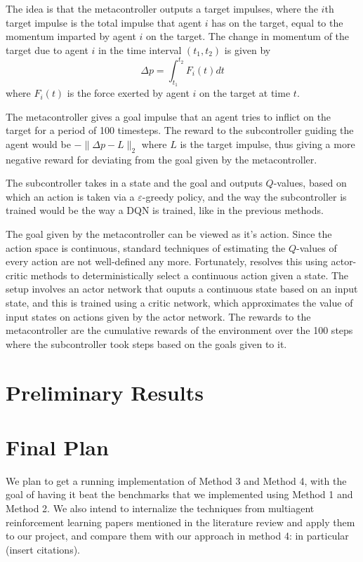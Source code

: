 \documentclass{article}
\begin{document}
The idea is that the metacontroller outputs a target
impulses, where the $i$th target impulse is the total impulse
that agent $i$ has on the target, equal to the momentum
imparted by agent $i$ on the target. The change in momentum of the target due to
agent $i$ in the time interval $(t_1,t_2)$ is given by
\[
\Delta p = \int_{t_1}^{t_2} F_i(t)dt
\]
where $F_i(t)$ is the force exerted by agent $i$ on the target at time $t$.

The metacontroller gives a goal impulse that an agent tries to inflict on the target
for a period of 100 timesteps.
The reward to the subcontroller guiding the agent would be $-\|\Delta p - L\|_2$ where
$L$ is the target impulse, thus giving a more negative reward for deviating from the
goal given by the metacontroller.

The subcontroller takes in a state and the goal and outputs $Q$-values, based on which
an action is taken via a $\varepsilon$-greedy policy, and the way the subcontroller is
trained would be the way a DQN is trained, like in the previous methods.

The goal given by the metacontroller can be viewed as it's action. Since the action
space is continuous, standard techniques of estimating the $Q$-values of every action
are not well-defined any more. Fortunately, \cite{lillicrap2015continuous} resolves
this using actor-critic methods to deterministically select a continuous action
given a state. The setup involves an actor network that ouputs a continuous state based
on an input state, and this is trained using a critic network, which approximates the
value of input states on actions given by the actor network. The rewards to the metacontroller
are the cumulative rewards of the environment over the 100 steps where the subcontroller
took steps based on the goals given to it.


\section{Preliminary Results}

\section{Final Plan}
We plan to get a running implementation of Method 3 and Method 4, with the goal
of having it beat the benchmarks that we implemented using Method 1 and Method 2. We also intend
to internalize the techniques from multiagent reinforcement learning papers mentioned
in the literature review and apply them to our project, and compare them
with our approach in method 4: in particular (insert citations).
\end{document}
